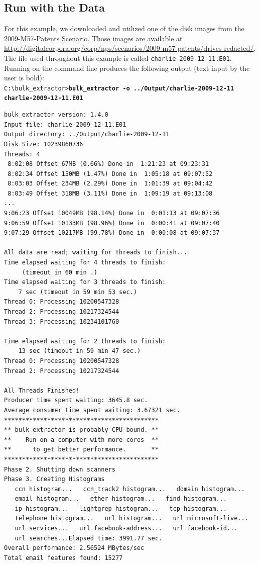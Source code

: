 \subsection{Run \bulk with the Data}
For this example, we downloaded and utilized one of the disk images from the 2009-M57-Patents Scenario. Those images are available at \url{http://digitalcorpora.org/corp/nps/scenarios/2009-m57-patents/drives-redacted/}. The file used throughout this example is called \texttt{charlie-2009-12-11.E01}. Running \bulk on the command line produces the following output (text input by the user is bold):\\

\begingroup
\footnotesize
\texttt{C:\textbackslash bulk\_extractor\textgreater \textbf{bulk\_extractor -o ../Output/charlie-2009-12-11 charlie-2009-12-11.E01}}
\endgroup
\begingroup
\footnotesize
\begin{Verbatim}[fontfamily=courier, commandchars=\\\{\}]
bulk_extractor version: 1.4.0
Input file: charlie-2009-12-11.E01
Output directory: ../Output/charlie-2009-12-11
Disk Size: 10239860736
Threads: 4
 8:02:08 Offset 67MB (0.66%) Done in  1:21:23 at 09:23:31
 8:02:34 Offset 150MB (1.47%) Done in  1:05:18 at 09:07:52
 8:03:03 Offset 234MB (2.29%) Done in  1:01:39 at 09:04:42
 8:03:49 Offset 318MB (3.11%) Done in  1:09:19 at 09:13:08
...
9:06:23 Offset 10049MB (98.14%) Done in  0:01:13 at 09:07:36
9:06:59 Offset 10133MB (98.96%) Done in  0:00:41 at 09:07:40
9:07:29 Offset 10217MB (99.78%) Done in  0:00:08 at 09:07:37

All data are read; waiting for threads to finish...
Time elapsed waiting for 4 threads to finish:
     (timeout in 60 min .)
Time elapsed waiting for 3 threads to finish:
    7 sec (timeout in 59 min 53 sec.)
Thread 0: Processing 10200547328
Thread 2: Processing 10217324544
Thread 3: Processing 10234101760

Time elapsed waiting for 2 threads to finish:
    13 sec (timeout in 59 min 47 sec.)
Thread 0: Processing 10200547328
Thread 2: Processing 10217324544

All Threads Finished!
Producer time spent waiting: 3645.8 sec.
Average consumer time spent waiting: 3.67321 sec.
*******************************************
** bulk_extractor is probably CPU bound. **
**    Run on a computer with more cores  **
**      to get better performance.       **
*******************************************
Phase 2. Shutting down scanners
Phase 3. Creating Histograms
   ccn histogram...   ccn_track2 histogram...   domain histogram...
   email histogram...   ether histogram...   find histogram...
   ip histogram...   lightgrep histogram...   tcp histogram...
   telephone histogram...   url histogram...   url microsoft-live...
   url services...   url facebook-address...   url facebook-id...
   url searches...Elapsed time: 3991.77 sec.
Overall performance: 2.56524 MBytes/sec
Total email features found: 15277
\end{Verbatim}
